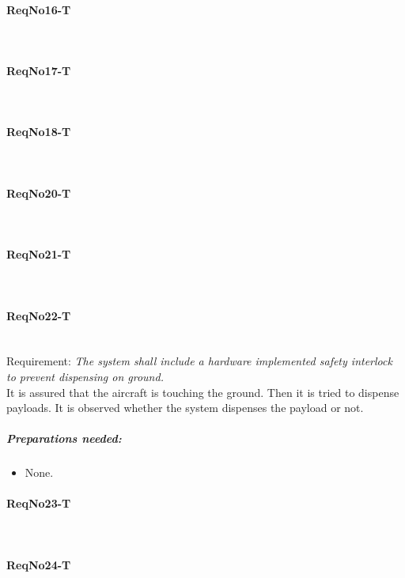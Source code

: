 \paragraph{ReqNo16-T}\mbox{}\\ %


\paragraph{ReqNo17-T}\mbox{}\\ %

\paragraph{ReqNo18-T}\mbox{}\\ %


\paragraph{ReqNo20-T}\mbox{}\\ %

\paragraph{ReqNo21-T}\mbox{}\\ %


\paragraph{ReqNo22-T}\mbox{}\\ %
Requirement: \textit{The system shall include a hardware implemented safety interlock to prevent dispensing on ground.}
\\
It is assured that the aircraft is touching the ground. Then it is tried to dispense payloads. It is observed whether the system dispenses the payload or not.
\\
	\subparagraph{Preparations needed:}
	\begin{itemize}
	\item None.
	\end{itemize} 

\paragraph{ReqNo23-T}\mbox{}\\ %


\paragraph{ReqNo24-T}\mbox{}\\ %

